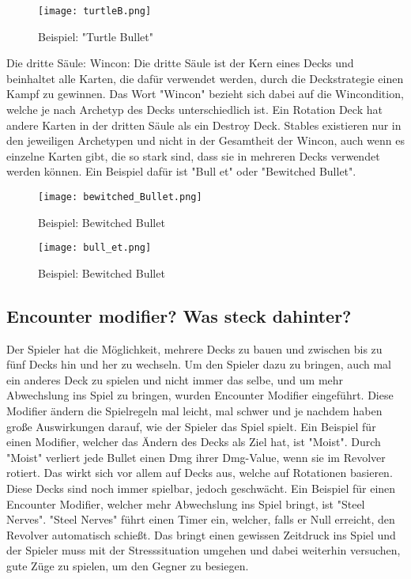 \begin{figure}[H]
    \centering
    \texttt{[image: turtleB.png]}
    \caption{Beispiel: "Turtle Bullet"}
\end{figure}

Die dritte Säule: Wincon:
Die dritte Säule ist der Kern eines Decks und beinhaltet alle Karten, die dafür verwendet werden, durch die Deckstrategie einen Kampf zu gewinnen.
Das Wort "Wincon" bezieht sich dabei auf die Wincondition, welche je nach Archetyp des Decks unterschiedlich ist.
Ein Rotation Deck hat andere Karten in der dritten Säule als ein Destroy Deck. Stables existieren nur in den jeweiligen Archetypen
und nicht in der Gesamtheit der Wincon, auch wenn es einzelne Karten gibt, die so stark sind, dass sie in mehreren Decks verwendet werden können.
Ein Beispiel dafür ist "Bull et" oder "Bewitched Bullet".

\begin{figure}[H]
    \centering
    \texttt{[image: bewitched\_Bullet.png]}
    \caption{Beispiel: Bewitched Bullet}
\end{figure}

\begin{figure}[H]
    \centering
    \texttt{[image: bull\_et.png]}
    \caption{Beispiel: Bewitched Bullet}
\end{figure}

\subsection{Encounter modifier? Was steck dahinter?}\label{subsec:placementMatters}

Der Spieler hat die Möglichkeit, mehrere Decks zu bauen und zwischen bis zu fünf Decks hin und her zu wechseln.
Um den Spieler dazu zu bringen, auch mal ein anderes Deck zu spielen und nicht immer das selbe, und um mehr
Abwechslung ins Spiel zu bringen, wurden Encounter Modifier eingeführt.
Diese Modifier ändern die Spielregeln mal leicht, mal schwer und je nachdem haben große Auswirkungen darauf, wie der Spieler das Spiel spielt.
Ein Beispiel für einen Modifier, welcher das Ändern des Decks als Ziel hat, ist "Moist". Durch "Moist" verliert jede Bullet einen Dmg ihrer Dmg-Value,
wenn sie im Revolver rotiert.
Das wirkt sich vor allem auf Decks aus, welche auf Rotationen basieren. Diese Decks sind noch immer spielbar, jedoch geschwächt.
Ein Beispiel für einen Encounter Modifier, welcher mehr Abwechslung ins Spiel bringt, ist "Steel Nerves". "Steel Nerves" führt
einen Timer ein, welcher, falls er Null erreicht, den Revolver automatisch schießt. Das bringt einen gewissen Zeitdruck
ins Spiel und der Spieler muss mit der Stresssituation umgehen und dabei weiterhin versuchen, gute Züge zu spielen, um den Gegner zu besiegen. %

